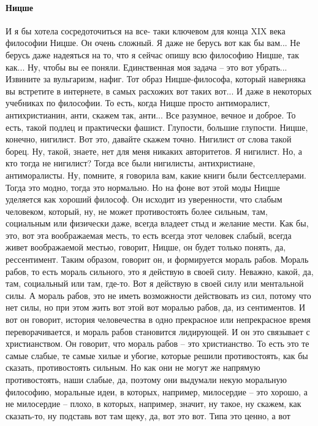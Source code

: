 \paragraph{Ницше}
И я бы хотела сосредоточиться на все-
таки ключевом для конца XIX века философии Ницше. Он очень сложный. Я даже не
берусь вот как бы вам... Не берусь даже надеяться на то, что я сейчас опишу всю
философию Ницше, так как... Ну, чтобы вы ее поняли. Единственная моя задача –
это вот убрать... Извините за вульгаризм, нафиг. Тот образ Ницше-философа,
который наверняка вы встретите в интернете, в самых расхожих вот таких вот... И
даже в некоторых учебниках по философии. То есть, когда Ницше просто
антиморалист, антихристианин, анти, скажем так, анти... Все разумное, вечное и
доброе. То есть, такой подлец и практически фашист. Глупости, большие глупости.
Ницше, конечно, нигилист. Вот это, давайте скажем точно. Нигилист от слова такой
борец. Ну, такой, знаете, нет для меня никаких авторитетов. Я нигилист. Но, а
кто тогда не нигилист? Тогда все были нигилисты, антихристиане, антиморалисты.
Ну, помните, я говорила вам, какие книги были бестселлерами. Тогда это модно,
тогда это нормально. Но на фоне вот этой моды Ницше уделяется как хороший
философ. Он исходит из уверенности, что слабым человеком, который, ну, не может
противостоять более сильным, там, социальным или физически даже, всегда владеет
стыд и желание мести. Как бы, это, вот эта воображаемая месть, то есть всегда
этот человек слабый, всегда живет воображаемой местью, говорит, Ницше, он будет
только понять, да, рессентимент. Таким образом, говорит он, и формируется мораль
рабов. Мораль рабов, то есть мораль сильного, это я действую в своей силу.
Неважно, какой, да, там, социальный или там, где-то. Вот я действую в своей силу
или ментальной силы. А мораль рабов, это не иметь возможности действовать из
сил, потому что нет силы, но при этом жить вот этой вот моралью рабов, да, из
сентиментов. И вот он говорит, история человечества в одно прекрасное или
непрекрасное время переворачивается, и мораль рабов становится лидирующей. И он
это связывает с христианством. Он говорит, что мораль рабов – это христианство.
То есть это те самые слабые, те самые хилые и убогие, которые решили
противостоять, как бы сказать, противостоять сильным. Но как они не могут же
напрямую противостоять, наши слабые, да, поэтому они выдумали некую моральную
философию, моральные идеи, в которых, например, милосердие – это хорошо, а не
милосердие – плохо, в которых, например, значит, ну такое, ну скажем, как
сказать-то, ну подставь вот там щеку, да, вот это вот. Типа это ценно, а вот
